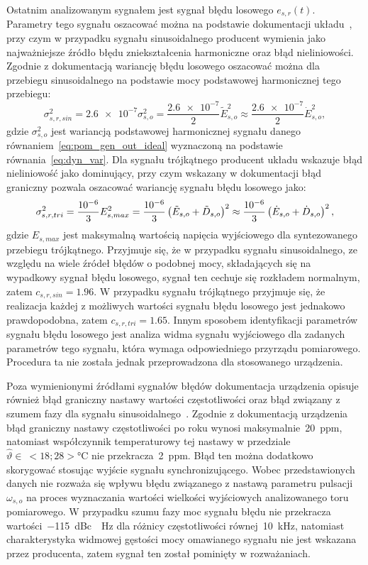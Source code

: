 Ostatnim analizowanym sygnałem jest sygnał błędu losowego $e_{s,r}(t)$. Parametry tego sygnału oszacować można na podstawie dokumentacji układu~\cite{rigol_fawg}, przy czym w przypadku sygnału sinusoidalnego producent wymienia jako najważniejsze źródło błędu zniekształcenia harmoniczne oraz błąd nieliniowości. Zgodnie z dokumentacją wariancję błędu losowego oszacować można dla przebiegu sinusoidalnego na podstawie mocy podstawowej harmonicznej tego przebiegu:
\begin{equation}
\sigma_{s,r,sin}^{2} = \num{2.6e-7} \sigma_{s,o}^{2} = \frac{\num{2.6e-7}}{2} \tilde{E}_{s,o}^{2} \approx \frac{\num{2.6e-7}}{2} \dot{E}_{s,o}^{2} \label{eq:pom_gen_var_rand_sin},
\end{equation}
gdzie $\sigma_{s,o}^{2}$ jest wariancją podstawowej harmonicznej sygnału danego równaniem~\eqref{eq:pom_gen_out_ideal} wyznaczoną na podstawie równania~\eqref{eq:dyn_var}. Dla sygnału trójkątnego producent układu wskazuje błąd nieliniowość jako dominujący, przy czym wskazany w dokumentacji błąd graniczny pozwala oszacować wariancję sygnału błędu losowego jako:
\begin{equation}
\sigma_{s,r,tri}^{2} = \frac{\num{e-6}}{3} E_{s,max}^{2} = \frac{\num{e-6}}{3} \left(\tilde{E}_{s,o} + \tilde{D}_{s,o}\right)^{2} \approx \frac{\num{e-6}}{3} \left(\dot{E}_{s,o} + \dot{D}_{s,o}\right)^{2} \label{eq:pom_gen_var_rand_saw},
\end{equation}
gdzie $E_{s,max}$ jest maksymalną wartością napięcia wyjściowego dla syntezowanego przebiegu trójkątnego. Przyjmuje się, że w przypadku sygnału sinusoidalnego, ze względu na wiele źródeł błędów o podobnej mocy, składających się na wypadkowy sygnał błędu losowego, sygnał ten cechuje się rozkładem normalnym, zatem $c_{s,r,sin} = \num{1.96}$. W przypadku sygnału trójkątnego przyjmuje się, że realizacja każdej z możliwych wartości sygnału błędu losowego jest jednakowo prawdopodobna, zatem $c_{s,r,tri} = \num{1.65}$. Innym sposobem identyfikacji parametrów sygnału błędu losowego jest analiza widma sygnału wyjściowego dla zadanych parametrów tego sygnału, która wymaga odpowiedniego przyrządu pomiarowego. Procedura ta nie została jednak przeprowadzona dla stosowanego urządzenia.

Poza wymienionymi źródłami sygnałów błędów dokumentacja urządzenia opisuje również błąd graniczny nastawy wartości częstotliwości oraz błąd związany z szumem fazy dla sygnału sinusoidalnego~\cite{rigol_fawg}. Zgodnie z dokumentacją urządzenia błąd graniczny nastawy częstotliwości po roku wynosi maksymalnie~\qty{20}{ppm}, natomiast współczynnik temperaturowy tej nastawy w przedziale $\hat{\vartheta} \in~<18;28>\unit{\degreeCelsius}$ nie przekracza~\qty{2}{ppm}. Błąd ten można dodatkowo skorygować stosując wyjście sygnału synchronizującego. Wobec przedstawionych danych nie rozważa się wpływu błędu związanego z nastawą parametru pulsacji $\omega_{s,o}$ na proces wyznaczania wartości wielkości wyjściowych analizowanego toru pomiarowego. W przypadku szumu fazy moc sygnału błędu nie przekracza wartości~\qty{-115}{dBc \per Hz} dla różnicy częstotliwości równej~\qty{10}{kHz}, natomiast charakterystyka widmowej gęstości mocy omawianego sygnału nie jest wskazana przez producenta, zatem sygnał ten został pominięty w rozważaniach.

